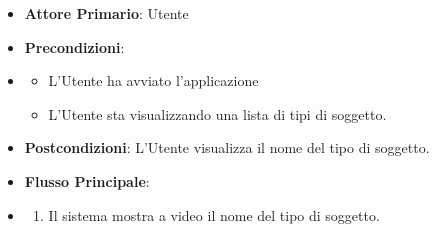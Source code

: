 \begin{itemize}
      \item \textbf{Attore Primario}: Utente
      \item \textbf{Precondizioni}:
      \item \begin{itemize}
            \item L'Utente ha avviato l'applicazione
            \item L'Utente sta visualizzando una lista di tipi di soggetto.
      \end{itemize}
      \item \textbf{Postcondizioni}: L'Utente visualizza il nome del tipo di soggetto.
      \item \textbf{Flusso Principale}:
      \item \begin{enumerate}
            \item Il sistema mostra a video il nome del tipo di soggetto.
      \end{enumerate}
\end{itemize}

